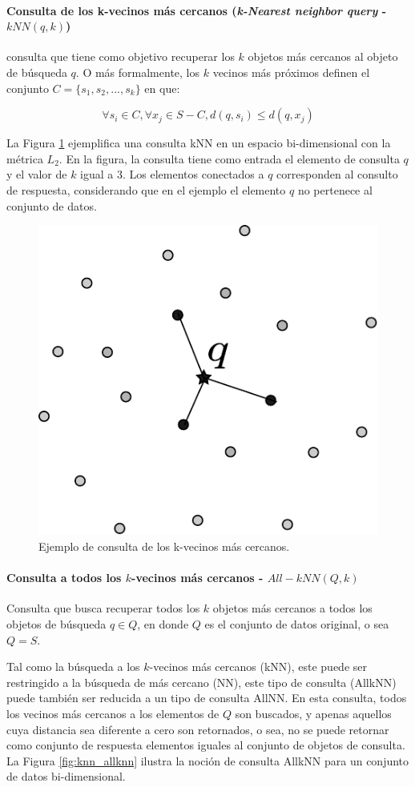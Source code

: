 \paragraph{Consulta de los k-vecinos más cercanos (\textit{k-Nearest neighbor query} - $kNN (q, k)$)} consulta que tiene como objetivo recuperar los $k$ objetos más cercanos al objeto de búsqueda $q$. O más formalmente, los $k$ vecinos más próximos definen el conjunto  $ C = \{s_1,s_2,...,s_k\} $ en que:

\begin{equation}
    \forall s_i \in C, \forall x_j \in S - C, d(q, s_i) \leq d(q, x_j)
\end{equation}

La Figura \ref{fig:knnQuery} ejemplifica una consulta kNN en un espacio bi-dimensional con la métrica $L_2$. En la figura, la consulta tiene como entrada el elemento de consulta $q$ y el valor de $k$ igual a $3$.  Los elementos conectados a $q$ corresponden al consulto de respuesta, considerando que en el ejemplo el elemento $q$ no pertenece al conjunto de datos.

\begin{figure}[htp]
\centering
\includegraphics[width=0.28\columnwidth]{images/knn_query.pdf}
\caption{Ejemplo  de consulta de los k-vecinos más cercanos.}
\label{fig:knnQuery}
\end{figure}

\paragraph{Consulta a todos los $k$-vecinos más cercanos - $All-kNN (Q, k)$ }

Consulta que busca recuperar todos los $k$ objetos más cercanos a todos los objetos de búsqueda $q \in Q$, en donde $Q$ es el conjunto de datos original, o sea $Q=S$.

Tal como la búsqueda a los $k$-vecinos más cercanos (kNN), este puede ser restringido a la búsqueda de más cercano (NN), este tipo de consulta (AllkNN) puede también  ser reducida a un tipo de consulta AllNN. En esta consulta, todos los vecinos más cercanos a los elementos de $Q$ son buscados, y apenas aquellos cuya distancia sea diferente a cero son retornados, o sea, no se puede retornar como conjunto de respuesta elementos iguales al conjunto de objetos de consulta. La Figura \ref{fig:knn_allknn}  ilustra la noción de consulta AllkNN para un conjunto de datos bi-dimensional.

